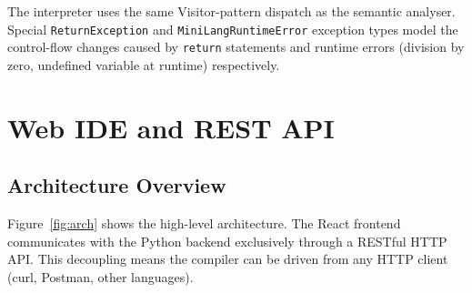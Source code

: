 \documentclass[conference]{IEEEtran}
\begin{document}
The interpreter uses the same Visitor-pattern dispatch as the semantic
analyser. Special \texttt{ReturnException} and
\texttt{MiniLangRuntimeError} exception types model the control-flow
changes caused by \texttt{return} statements and runtime errors
(division by zero, undefined variable at runtime) respectively.

\section{Web IDE and REST API}
\label{sec:ide}

\subsection{Architecture Overview}

Figure~\ref{fig:arch} shows the high-level architecture. The React
frontend communicates with the Python backend exclusively through a
RESTful HTTP API. This decoupling means the compiler can be driven from
any HTTP client (curl, Postman, other languages).
\end{document}
